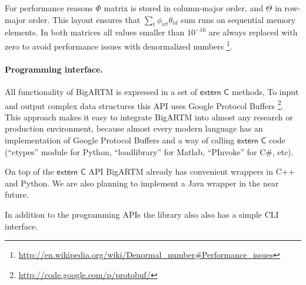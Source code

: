 \documentclass[russian]{llncs}
\newcommand{\kw}[1]{\textsf{#1}}
\begin{document}
For performance reasons $\Phi$ matrix is stored in column-major order, and $\Theta$ in row-major order.
This layout ensures that $\sum_t \phi_{wt} \theta_{td}$ sum runs on sequential memory elements.
In both matrices all values smaller than $10^{-16}$ are always replaced with zero to avoid performance issues with denormalized numbers
\footnote{\url{http://en.wikipedia.org/wiki/Denormal_number#Performance_issues}}.

\paragraph{Programming interface.}
All functionality of BigARTM is expressed in a set of $\kw{extern C}$ methods,
To input and output complex data structures this API uses Google Protocol Buffers
\footnote{\url{http://code.google.com/p/protobuf/}}.
This approach makes it easy to integrate BigARTM into almost any research or production environment,
because almost every modern language has an implementation of Google Protocol Buffers
and a way of calling $\kw{extern C}$ code
(``ctypes'' module for Python, ``loadlibrary'' for Matlab, ``PInvoke'' for C\#, etc).

On top of the $\kw{extern C}$ API BigARTM already has convenient wrappers in C++ and Python.
We are also planning to implement a Java wrapper in the near future.

In addition to the programming APIs the library also also has a simple CLI interface.
\end{document}
